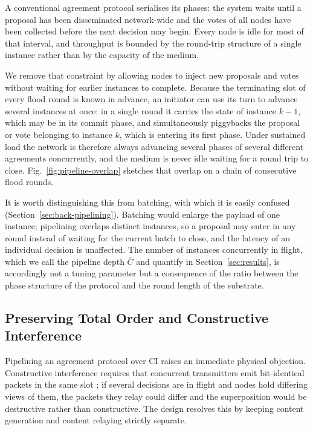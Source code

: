 \documentclass[journal]{IEEEtran}
\newcommand{\CI}{CI}                      %
\newcommand{\Cdepth}{\bar{C}}             %
\begin{document}
A conventional agreement protocol serialises its phases: the system waits
until a proposal has been disseminated network-wide and the votes of all
nodes have been collected before the next decision may begin. Every node
is idle for most of that interval, and throughput is bounded by the
round-trip structure of a single instance rather than by the capacity of
the medium.

We remove that constraint by allowing nodes to inject new proposals and
votes without waiting for earlier instances to complete. Because the
terminating slot of every flood round is known in advance, an initiator
can use its turn to advance several instances at once: in a single round
it carries the state of instance $k-1$, which may be in its commit phase,
and simultaneously piggybacks the proposal or vote belonging to instance
$k$, which is entering its first phase. Under sustained load the network
is therefore always advancing several phases of several different
agreements concurrently, and the medium is never idle waiting for a
round trip to close. Fig.~\ref{fig:pipeline-overlap} sketches that overlap on a
chain of consecutive flood rounds.

It is worth distinguishing this from batching, with which it is easily
confused (Section~\ref{sec:back-pipelining}). Batching would enlarge the
payload of one instance; pipelining overlaps distinct instances, so a
proposal may enter in any round instead of waiting for the current batch
to close, and the latency of an individual decision is unaffected. The
number of instances concurrently in flight, which we call the pipeline
depth $\Cdepth$ and quantify in Section~\ref{sec:results}, is accordingly
not a tuning parameter but a consequence of the ratio between the phase
structure of the protocol and the round length of the substrate.

\subsection{Preserving Total Order and Constructive Interference}
\label{sec:design-order}

Pipelining an agreement protocol over \CI{} raises an immediate physical
objection. Constructive interference requires that concurrent
transmitters emit bit-identical packets in the same slot
\cite{ferrari11glossy}; if several decisions are in flight and nodes hold
differing views of them, the packets they relay could differ and the
superposition would be destructive rather than constructive. The design
resolves this by keeping content generation and content relaying strictly
separate.
\end{document}
